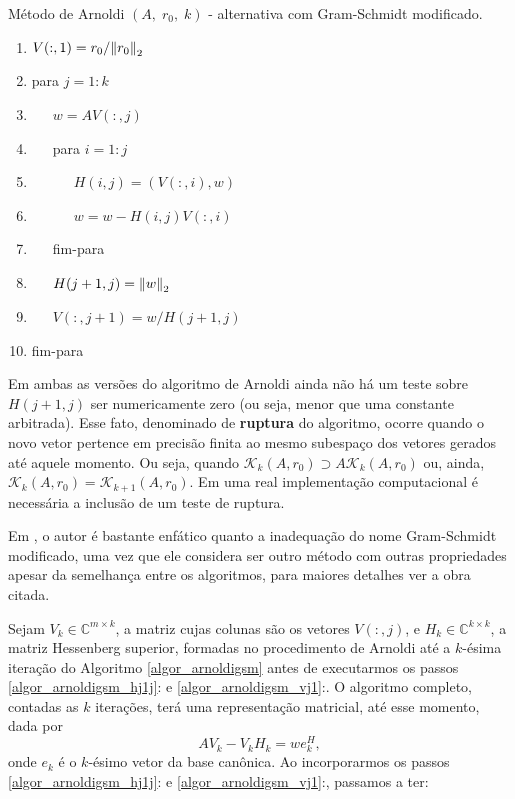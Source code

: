      \begin{algor}[htb]
\caption{ Método  de Arnoldi $(A,\;r_0,\;k)$  - alternativa com  Gram-Schmidt modificado.}\label{algor_arnoldigsm}

  {%
\begin{enumerate}
\renewcommand{\labelenumi}{\theenumi:}
\setlength{\itemsep}{.01cm}
\item $V(:,1)=r_0/{\Vert r_0\Vert}_2$
\item para $j=1:k$
\item\label{algor_arnoldigsm_it_wav}~~~$w=AV(:,j)$
\item~~~para $i=1:j$
\item~~~~~~$H(i,j)=(V(:,i),w)$
\item~~~~~~$w=w-H(i,j)V(:,i)$
\item~~~fim-para
\item\label{algor_arnoldigsm_hj1j}~~~$H(j+1,j)={\Vert w\Vert}_2$
\item\label{algor_arnoldigsm_vj1}~~~$V(:,j+1)=w/H(j+1,j)$
\item fim-para
\renewcommand{\labelenumi}{\theenumi.}
\end{enumerate}
}
\end{algor}
\begin{obs}\label{obs_arnoldiruptura}
Em ambas as versões do algoritmo de Arnoldi ainda não há um teste  sobre  $H(j+1,j)$ ser numericamente zero (ou seja, menor que uma constante arbitrada). Esse fato, denominado de \textbf{ruptura} do algoritmo, ocorre quando o novo vetor pertence em precisão finita ao mesmo subespaço dos vetores  gerados  até  aquele momento. Ou seja, quando $\mathcal{K}_k(A,r_0)\supset A\mathcal{K}_k(A,r_0)$ ou, ainda, $\mathcal{K}_k(A,r_0)= \mathcal{K}_{k+1}(A,r_0)$. Em uma real implementação computacional é necessária a inclusão  de um teste de ruptura.
\end{obs}
\begin{obs}\label{obs_mgsgsdif}
Em \cite[pág. 279]{Stewart98Matrix}, o autor é bastante enfático quanto a inadequação do nome Gram-Schmidt modificado, uma vez que ele considera ser outro método com outras propriedades apesar da semelhança entre os algoritmos, para maiores detalhes ver a obra citada.
\end{obs}
Sejam $V_k\in\mathbb{C}^{m\times k}$, a matriz cujas colunas são  os vetores $V(:,j)$, e $H_k\in\mathbb{C}^{k\times k}$, a matriz Hessenberg superior, formadas no procedimento de Arnoldi  até  a $k$-ésima iteração do Algoritmo \ref{algor_arnoldigsm} antes de executarmos os passos \ref{algor_arnoldigsm_hj1j}: e \ref{algor_arnoldigsm_vj1}:. O algoritmo completo, contadas as $k$ iterações, terá uma representação matricial,  até  esse momento, dada por
\begin{equation}\label{arnol_prop_avk-vkhwekh}
AV_k-V_kH_k=we_k^H,
\end{equation}
onde $e_k$ é o $k$-ésimo vetor da base canônica. Ao incorporarmos os passos  \ref{algor_arnoldigsm_hj1j}: e \ref{algor_arnoldigsm_vj1}:, passamos a ter:

